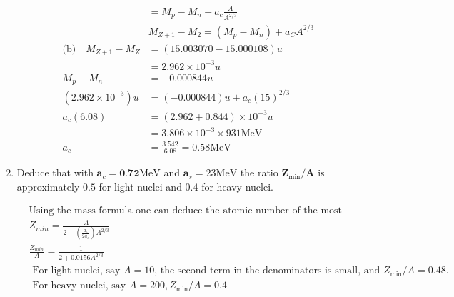 \begin{enumerate}
\begin{answer}
\begin{align*}
	&=M_p-M_n+a_c \frac{A}{A^{2 / 3}}\\
	&M_{Z+1}-M_2=\left(M_p-M_n\right)+a_C A^{2 / 3}\\
	\text{(b)}\quad M_{Z+1}-M_Z &=(15.003070-15.000108) u \\
	&=2.962 \times 10^{-3} u \\
	M_p-M_n &=-0.000844 u \\
	\left(2.962 \times 10^{-3}\right) u &=(-0.000844) u+a_c(15)^{2 / 3} \\
	a_c(6.08) &=(2.962+0.844) \times 10^{-3} u \\
	&=3.806 \times 10^{-3} \times 931 \mathrm{MeV} \\
	a_c &=\frac{3.542}{6.08}=0.58 \mathrm{MeV}
	\end{align*}
\end{answer}
\item  Deduce that with $\boldsymbol{a}_c=\mathbf{0 . 7 2} \mathrm{MeV}$ and $\boldsymbol{a}_s=23 \mathrm{MeV}$ the ratio $\mathbf{Z}_{\min } / \mathbf{A}$ is approximately $0.5$ for light nuclei and $0.4$ for heavy nuclei.
\begin{answer}
	\begin{align*}
	 &\text{Using the mass formula one can deduce the atomic number of the most stable isobar. It is given by}\\
	&Z_{m i n}=\frac{A}{2+\left(\frac{a_c}{2a_s}\right) A^{2 / 3}} \\
	&\frac{Z_{m i n}}{A}=\frac{1}{2+0.0156 A^{2/3}}\\
&\text{	For light nuclei, say $A=10$, the second term in the denominators is small, and $Z_{\min } / A=0.48$.}\\
&\text{	For heavy nuclei, say $A=200, Z_{\min } / A=0.4$}
	\end{align*}
\end{answer}
\end{enumerate}